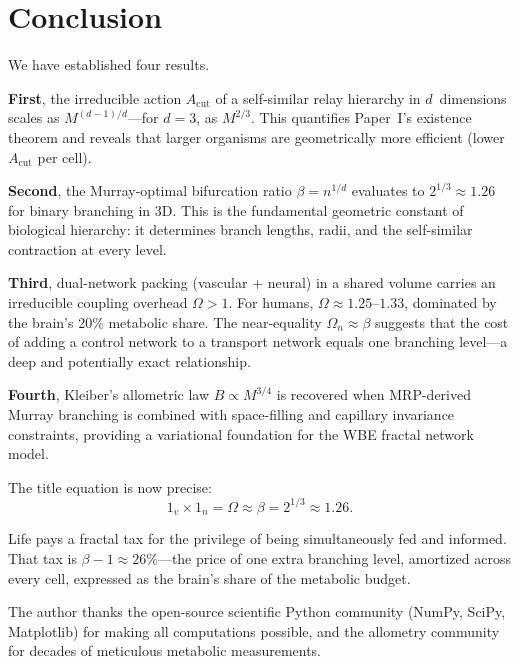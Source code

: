 \documentclass[aps,pre,twocolumn,superscriptaddress,longbibliography]{revtex4-2}
\newcommand{\Acut}{A_{\text{cut}}}
\begin{document}
\section{Conclusion}
\label{sec:conclusion}

We have established four results.

\textbf{First}, the irreducible action $\Acut$ of a
self-similar relay hierarchy in $d$~dimensions scales as
$M^{(d-1)/d}$---for $d = 3$, as $M^{2/3}$.
This quantifies Paper~I's existence theorem and reveals
that larger organisms are geometrically more efficient
(lower $\Acut$ per cell).

\textbf{Second}, the Murray-optimal bifurcation ratio
$\beta = n^{1/d}$ evaluates to $2^{1/3} \approx 1.26$
for binary branching in 3D.
This is the fundamental geometric constant of
biological hierarchy: it determines branch lengths,
radii, and the self-similar contraction at every level.

\textbf{Third}, dual-network packing (vascular + neural)
in a shared volume carries an irreducible coupling
overhead $\Omega > 1$.
For humans, $\Omega \approx 1.25$--$1.33$, dominated by
the brain's 20\% metabolic share.
The near-equality $\Omega_n \approx \beta$ suggests that
the cost of adding a control network to a transport
network equals one branching level---a deep and potentially
exact relationship.

\textbf{Fourth}, Kleiber's allometric law
$B \propto M^{3/4}$ is recovered when MRP-derived Murray
branching is combined with space-filling and capillary
invariance constraints, providing a variational
foundation for the WBE fractal network model.

The title equation is now precise:
\begin{equation}
  1_v \times 1_n = \Omega \approx \beta = 2^{1/3} \approx 1.26.
  \label{eq:final}
\end{equation}

Life pays a fractal tax for the privilege of being
simultaneously fed and informed.
That tax is $\beta - 1 \approx 26\%$---the price of one
extra branching level, amortized across every cell,
expressed as the brain's share of the metabolic budget.


\begin{acknowledgments}
The author thanks the open-source scientific Python community
(NumPy, SciPy, Matplotlib) for making all computations possible,
and the allometry community for decades of meticulous metabolic
measurements.
\end{acknowledgments}
\end{document}
